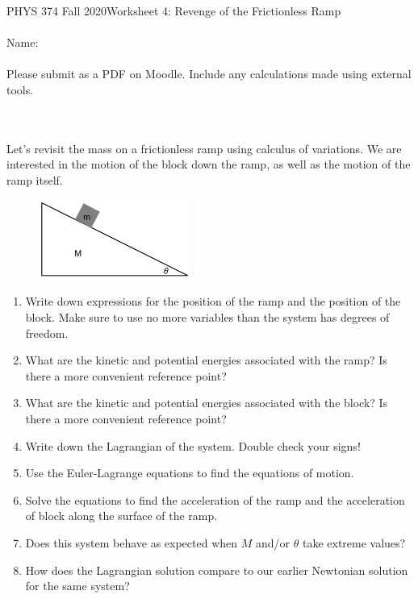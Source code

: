 \documentclass[12pt]{article}
\begin{document}
PHYS 374 Fall 2020\hfill Worksheet 4: Revenge of the Frictionless Ramp\\
\\
Name: \\
\\
Please submit as a PDF on Moodle. Include any calculations made using external tools.

\hrulefill
\\
\\
Let's revisit the mass on a frictionless ramp using calculus of variations. We are interested in the motion of the block down the ramp, as well as the motion of the ramp itself. \begin{figure}[h]
\includegraphics[width=5cm]{Diagram.pdf}
\centering
\end{figure}
\begin{enumerate}
\item Write down expressions for the position of the ramp and the position of the block. Make sure to use no more variables than the system has degrees of freedom.
\item What are the kinetic and potential energies associated with the ramp? Is there a more convenient reference point?
\item What are the kinetic and potential energies associated with the block? Is there a more convenient reference point?
\item Write down the Lagrangian of the system. Double check your signs!
\item Use the Euler-Lagrange equations to find the equations of motion.
\item Solve the equations to find the acceleration of the ramp and the acceleration of block along the surface of the ramp.
\item Does this system behave as expected when $M$ and/or $\theta$ take extreme values?
\item How does the Lagrangian solution compare to our earlier Newtonian solution for the same system?
\end{enumerate}
\end{document}
